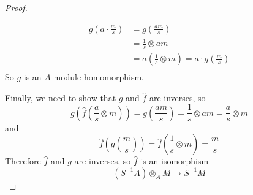 \documentclass[hidelinks,12pt]{article}
\begin{document}
\begin{proof}
\begin{itemize}
        \begin{align*}
        g\left(a\cdot \frac{m}{s}\right)&=g\left(\frac{am}{s}\right)\\
        &=\frac{1}{s}\otimes am\\
        &=a(\frac{1}{s}\otimes m)=a\cdot g\left(\frac{m}{s}\right)\\
        \end{align*}
        So \(g\) is an \(A\)-module homomorphism.
\end{itemize}
Finally, we need to show that \(g\) and \(\hat{f}\) are inverses, so \[
    g\left(\hat{f}\left(\frac{a}{s}\otimes m\right)\right)=g\left(\frac{am}{s}\right)=\frac{1}{s}\otimes am=\frac{a}{s}\otimes m
\]
and 
\[
    \hat{f}\left(g\left(\frac{m}{s}\right)\right)=\hat{f}\left(\frac{1}{s}\otimes m\right)=\frac{m}{s}
\]
Therefore \(\hat{f}\) and \(g\) are inverses, so \(\hat{f}\) is an isomorphism
\[
    (S^{-1}A)\otimes_{A}M\to S^{-1}M
\]
\end{proof}
\end{document}
